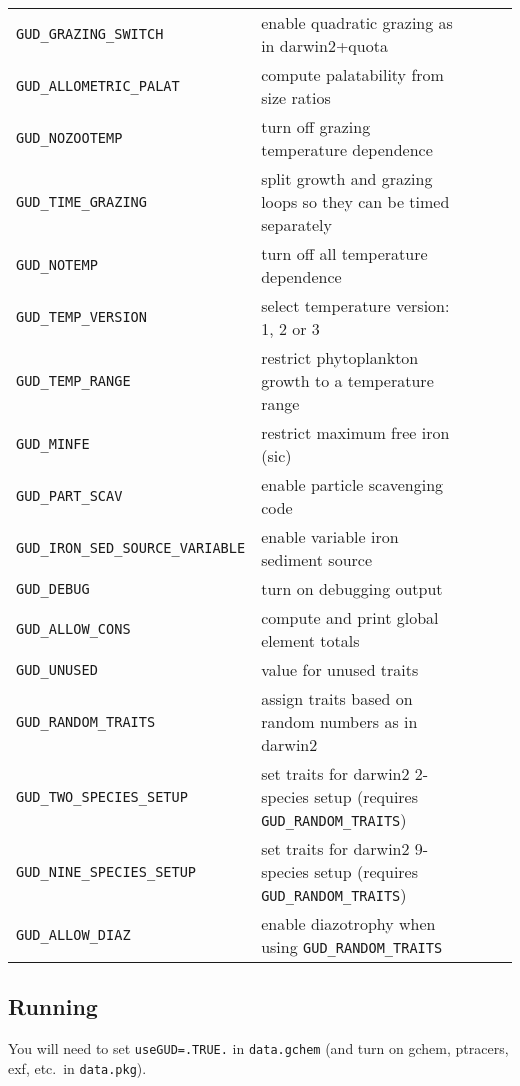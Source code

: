 \documentclass[11pt,letterpaper,english]{article}
\begin{document}
{{\begin{longtable}[l]{ll>{$}l<{$}l>{$}r<{$}}
  \hline
  \verb|GUD_GRAZING_SWITCH|           & enable quadratic grazing as in darwin2+quota \\
  \verb|GUD_ALLOMETRIC_PALAT|         & compute palatability from size ratios \\
  \verb|GUD_NOZOOTEMP|                & turn off grazing temperature dependence \\
  \verb|GUD_TIME_GRAZING|             & split growth and grazing loops so they can be timed separately \\
  \hline
  \verb|GUD_NOTEMP|                   & turn off all temperature dependence \\
  \verb|GUD_TEMP_VERSION|             & select temperature version: 1, 2 or 3 \\
  \verb|GUD_TEMP_RANGE|               & restrict phytoplankton growth to a temperature range \\
  \hline
  \verb|GUD_MINFE|                    & restrict maximum free iron (sic) \\
  \verb|GUD_PART_SCAV|                & enable particle scavenging code \\
  \verb|GUD_IRON_SED_SOURCE_VARIABLE| & enable variable iron sediment source \\
  \hline
  \verb|GUD_DEBUG|                    & turn on debugging output \\
  \verb|GUD_ALLOW_CONS|               & compute and print global element totals \\
  \verb|GUD_UNUSED|                   & value for unused traits \\
  \hline
  \verb|GUD_RANDOM_TRAITS|            & assign traits based on random numbers as in darwin2 \\
  \verb|GUD_TWO_SPECIES_SETUP|        & set traits for darwin2 2-species setup (requires \verb|GUD_RANDOM_TRAITS|) \\
  \verb|GUD_NINE_SPECIES_SETUP|       & set traits for darwin2 9-species setup (requires \verb|GUD_RANDOM_TRAITS|) \\
  \verb|GUD_ALLOW_DIAZ|               & enable diazotrophy when using \verb|GUD_RANDOM_TRAITS| \\
  \hline
\end{longtable}}



\subsection{Running}

You will need to set \verb|useGUD=.TRUE.| in \verb|data.gchem| (and turn on
gchem, ptracers, exf, etc.\ in \verb|data.pkg|).

}
\end{document}

